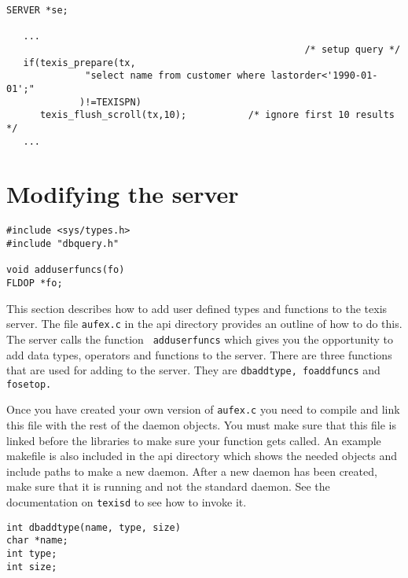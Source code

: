 \EXAMPLE
\begin{verbatim}
SERVER *se;

   ...
                                                     /* setup query */
   if(texis_prepare(tx,
              "select name from customer where lastorder<'1990-01-01';"
             )!=TEXISPN)
      texis_flush_scroll(tx,10);           /* ignore first 10 results */
   ...
\end{verbatim}



\newpage\section{Modifying the server}


\SYNOPSIS
\begin{verbatim}
#include <sys/types.h>
#include "dbquery.h"

void adduserfuncs(fo)
FLDOP *fo;
\end{verbatim}

\DESCRIPTION

This section describes how to add user defined types and functions to the
texis server. The file {\tt aufex.c} in the api directory provides an
outline of how to do this.  The server calls the function {\tt
adduserfuncs} which gives you the opportunity to add data types, operators
and functions to the server.  There are three functions that are used for
adding to the server. They are {\tt dbaddtype, foaddfuncs} and {\tt
fosetop.}

Once you have created your own version of {\tt aufex.c} you need to
compile and link this file with the rest of the daemon objects.  You must
make sure that this file is linked before the libraries to make sure your
function gets called.  An example makefile is also included in the api
directory which shows the needed objects and include paths to make a new
daemon.  After a new daemon has been created, make sure that it is running
and not the standard daemon.  See the documentation on {\tt texisd} to see
how to invoke it.


\SYNOPSIS
\begin{verbatim}
int dbaddtype(name, type, size)
char *name;
int type;
int size;
\end{verbatim}

